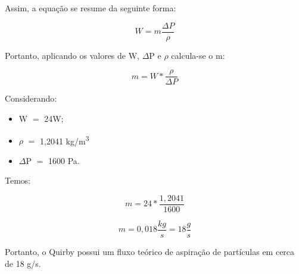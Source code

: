 Assim, a equação se resume da seguinte forma:

\begin{equation}
W = m\frac{\Delta P}{\rho}
\end{equation}

Portanto, aplicando os valores de W, $\Delta$P e \(\rho\) calcula-se o m:


\begin{equation}
m=W\ast\frac{\rho}{\Delta P}
\end{equation}

Considerando:

\begin{itemize}
	\item W $=$ 24W;
	\item \(\rho\) $=$ 1,2041 kg/m\textsuperscript{3}
	\item {$\Delta$P} $=$ 1600 Pa.
\end{itemize}

Temos:

\begin{equation}
m=24\ast\frac{1,2041}{1600}
\end{equation}

\begin{equation}
m = 0,018\frac{kg}{s} = 18\frac{g}{s}    
\end{equation}

\vspace{1\baselineskip}
Portanto, o Quirby possui um fluxo teórico de aspiração de partículas em cerca de 18 g/s.